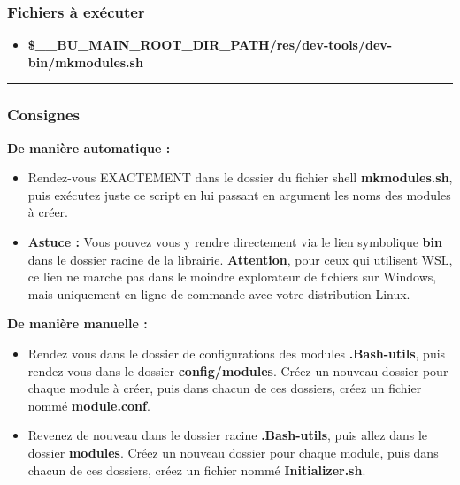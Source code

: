 \documentclass[a4paper,10pt]{article}
\begin{document}
\color{sec3}
\subsubsection{Fichiers à exécuter}\color{text}

\begin{itemize}
    \item \textbf{\color{vars}\$\_\_BU\_MAIN\_ROOT\_DIR\_PATH\color{path}/res/dev-tools/dev-bin/mkmodules.sh}\\[1\baselineskip]
\end{itemize}


\color{sec3}\par\noindent\rule{\textwidth}{0.4pt}\color{text}

\color{sec3}
\subsubsection{Consignes}\color{text}

\begin{justify}
    \textbf{De manière automatique :}

    \begin{itemize}
        \item Rendez-vous EXACTEMENT dans le dossier du fichier shell \textbf{\color{path}mkmodules.sh}, puis exécutez juste ce script en lui passant en argument les noms des modules à créer.\\\mbox{}

        \item \textbf{Astuce :} Vous pouvez vous y rendre directement via le lien symbolique \textbf{\color{path}bin} dans le dossier racine de la librairie. \textbf{Attention}, pour ceux qui utilisent WSL, ce lien ne marche pas dans le moindre explorateur de fichiers sur Windows, mais uniquement en ligne de commande avec votre distribution Linux.
    \end{itemize}
\end{justify}

\begin{justify}
    \textbf{De manière manuelle :}
    \begin{itemize}
        \item  Rendez vous dans le dossier de configurations des modules \textbf{\color{path}.Bash-utils}, puis rendez vous dans le dossier \textbf{\color{path}config/modules}. Créez un nouveau dossier pour chaque module à créer, puis dans chacun de ces dossiers, créez un fichier nommé \textbf{\color{path}module.conf}.\\\mbox{}

        \item Revenez de nouveau dans le dossier racine \textbf{\color{path}.Bash-utils}, puis allez dans le dossier \textbf{\color{path}modules}. Créez un nouveau dossier pour chaque module, puis dans chacun de ces dossiers, créez un fichier nommé \textbf{\color{path}Initializer.sh}.
    \end{itemize}
\end{justify}
\end{document}
